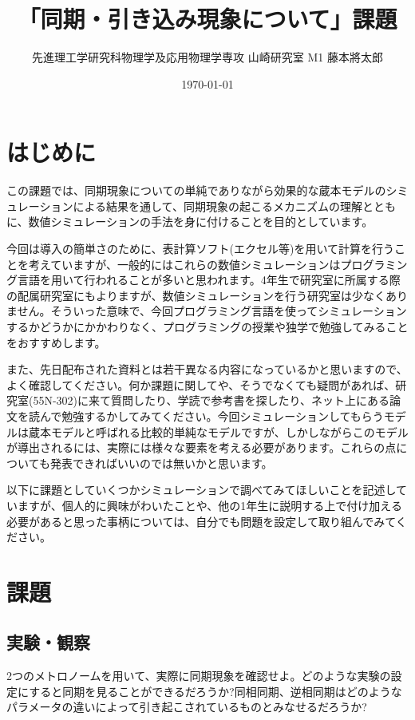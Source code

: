 \documentclass{jsarticle}
\title{「同期・引き込み現象について」課題}
\author{先進理工学研究科物理学及応用物理学専攻 山崎研究室 M1 藤本將太郎}
\date{\today}
\begin{document}
\maketitle

\section{はじめに}
この課題では、同期現象についての単純でありながら効果的な蔵本モデルのシミュレーションによる結果を通して、同期現象の起こるメカニズムの理解とともに、数値シミュレーションの手法を身に付けることを目的としています。

今回は導入の簡単さのために、表計算ソフト(エクセル等)を用いて計算を行うことを考えていますが、一般的にはこれらの数値シミュレーションはプログラミング言語を用いて行われることが多いと思われます。4年生で研究室に所属する際の配属研究室にもよりますが、数値シミュレーションを行う研究室は少なくありません。そういった意味で、今回プログラミング言語を使ってシミュレーションするかどうかにかかわりなく、プログラミングの授業や独学で勉強してみることをおすすめします。

また、先日配布された資料とは若干異なる内容になっているかと思いますので、よく確認してください。何か課題に関してや、そうでなくても疑問があれば、研究室(55N-302)に来て質問したり、学読で参考書を探したり、ネット上にある論文を読んで勉強するかしてみてください。今回シミュレーションしてもらうモデルは蔵本モデルと呼ばれる比較的単純なモデルですが、しかしながらこのモデルが導出されるには、実際には様々な要素を考える必要があります。これらの点についても発表できればいいのでは無いかと思います。

以下に課題としていくつかシミュレーションで調べてみてほしいことを記述していますが、個人的に興味がわいたことや、他の1年生に説明する上で付け加える必要があると思った事柄については、自分でも問題を設定して取り組んでみてください。

\section{課題}
\subsection{実験・観察}
    2つのメトロノームを用いて、実際に同期現象を確認せよ。どのような実験の設定にすると同期を見ることができるだろうか?同相同期、逆相同期はどのようなパラメータの違いによって引き起こされているものとみなせるだろうか?
\end{document}
